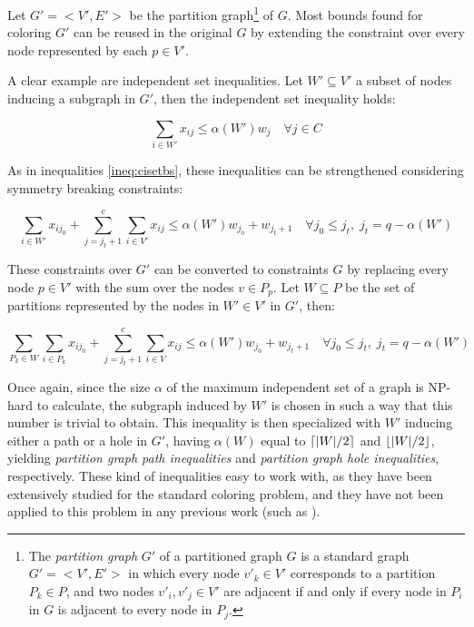 Let $G' = <V',E'>$ be the partition graph\footnote{The \textit{partition graph} $G'$ of a partitioned graph $G$ is a standard graph $G'=<V',E'>$ in which every node $v'_k \in V'$ corresponds to a partition $P_k \in P$, and two nodes $v'_i,v'_j \in V'$ are adjacent if and only if every node in $P_i$ in $G$ is adjacent to every node in $P_j$.} of $G$. Most bounds found for coloring $G'$ can be reused in the original $G$ by extending the constraint over every node represented by each $p \in V'$.

A clear example are independent set inequalities. Let $W' \subseteq V'$ a subset of nodes inducing a subgraph in $G'$, then the independent set inequality holds:

\begin{equation}
\label{ineq:gpiset}
\sum _{i \in W'} x_{ij} \leq \alpha(W') w_{j} \quad \forall j \in C
\end{equation}

As in inequalities \ref{ineq:cisetbs}, these inequalities can be strengthened considering symmetry breaking constraints:

\begin{equation}
\label{ineq:gpisetbs}
\sum_{i \in W'} x_{ij_0} + \sum ^c _{j = j_t + 1} \sum _{i \in V'} x_{ij} \leq \alpha(W') w_{j_0} + w_{j_t + 1} \quad \forall j_0 \leq j_t, \; j_t = q - \alpha(W')
\end{equation}

These constraints over $G'$ can be converted to constraints $G$ by replacing every node $p \in V'$ with the sum over the nodes $v \in P_p$. Let $W \subseteq P$ be the set of partitions represented by the nodes in $W' \in V'$ in $G'$, then:

\begin{equation}
\label{ineq:gpisetbsg}
\sum_{P_k \in W} \sum_{i \in P_k} x_{ij_0} + \sum ^c _{j = j_t + 1} \sum _{i \in V} x_{ij} \leq \alpha(W') w_{j_0} + w_{j_t + 1} \quad \forall j_0 \leq j_t, \; j_t = q - \alpha(W')
\end{equation}

Once again, since the size $\alpha$ of the maximum independent set of a graph is NP-hard to calculate, the subgraph induced by $W'$ is chosen in such a way that this number is trivial to obtain. This inequality is then specialized with $W'$ inducing either a path or a hole in $G'$, having $\alpha(W)$ equal to $\left\lceil |W| / 2 \right\rceil$ and $\left\lfloor |W| / 2 \right\rfloor$, yielding \textit{partition graph path inequalities} and \textit{partition graph hole inequalities}, respectively. These kind of inequalities easy to work with, as they have been extensively studied for the standard coloring problem, and they have not been applied to this problem in any previous work (such as \cite{frota2010branch}).


